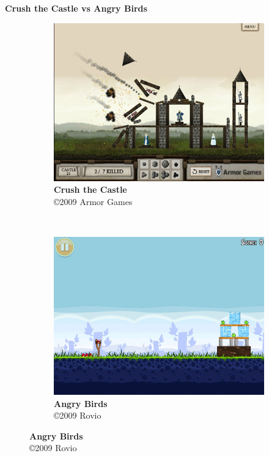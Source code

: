 \expandafter\documentclass\expandafter[table, usenames, svgnames, dvipsnames, \classopts]{beamer}
\begin{document}
\begin{frame}{\textbf{Crush the Castle vs Angry Birds}}

	\begin{figure}
	    \centering

	    \begin{subfigure}[!h]{0.4\paperwidth}
	    	\centering
	    	\includegraphics[height=0.4\paperheight]{crush-castle-screenshot}
	        \caption{\scriptsize\textbf{Crush the Castle}\\\copyright{2009} Armor Games\footnotemark{}}
	    \end{subfigure}
	    ~
		\begin{subfigure}[!h]{0.4\paperwidth}
			\centering
	        \includegraphics[height=0.4\paperheight]{angry-birds-screenshot}
	        \caption{\scriptsize\textbf{Angry Birds}\\\copyright{2009} Rovio\footnotemark{}}
	    \end{subfigure}
    \end{figure}


\end{frame}
\end{document}

